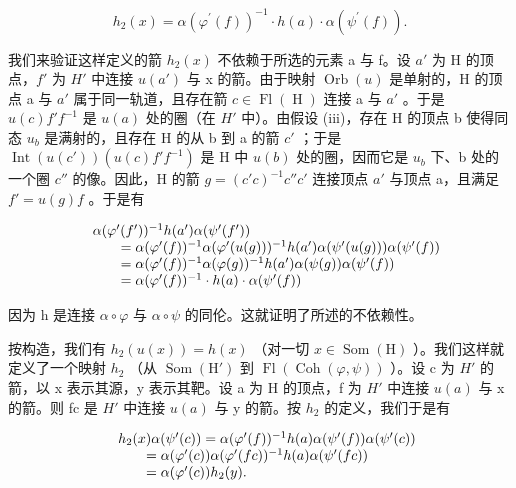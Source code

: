\[
h _ {2} (x) = \alpha (\varphi^ {\prime} (f)) ^ {- 1} \cdot h (a) \cdot \alpha (\psi^ {\prime} (f)).
\]

我们来验证这样定义的箭 \(h_{2}(x)\) 不依赖于所选的元素 a 与 f。设 \(a'\) 为 H 的顶点，\(f'\) 为 \(H'\) 中连接 \(u(a')\) 与 x 的箭。由于映射 \(\operatorname{Orb}(u)\) 是单射的，H 的顶点 a 与 \(a'\) 属于同一轨道，且存在箭 \(c \in \operatorname{Fl}(\operatorname{H})\) 连接 a 与 \(a'\) 。于是 \(u(c)f'f^{-1}\) 是 \(u(a)\) 处的圈（在 \(H'\) 中）。由假设 (iii)，存在 H 的顶点 b 使得同态 \(u_{b}\) 是满射的，且存在 H 的从 b 到 a 的箭 \(c'\) ；于是 \(\operatorname{Int}(u(c'))(u(c)f'f^{-1})\) 是 H 中 \(u(b)\) 处的圈，因而它是 \(u_{b}\) 下、b 处的一个圈 \(c''\) 的像。因此，H 的箭 \(g = (c'c)^{-1}c''c'\) 连接顶点 \(a'\) 与顶点 a，且满足 \(f' = u(g)f\) 。于是有

\[
\begin{array}{r l} & {\alpha (\varphi^ {\prime} (f ^ {\prime})) ^ {- 1} h (a ^ {\prime}) \alpha (\psi^ {\prime} (f ^ {\prime}))} \\ & {\qquad = \alpha (\varphi^ {\prime} (f)) ^ {- 1} \alpha (\varphi^ {\prime} (u (g))) ^ {- 1} h (a ^ {\prime}) \alpha (\psi^ {\prime} (u (g))) \alpha (\psi^ {\prime} (f))} \\ & {\qquad = \alpha (\varphi^ {\prime} (f)) ^ {- 1} \alpha (\varphi (g)) ^ {- 1} h (a ^ {\prime}) \alpha (\psi (g)) \alpha (\psi^ {\prime} (f))} \\ & {\qquad = \alpha (\varphi^ {\prime} (f)) ^ {- 1} \cdot h (a) \cdot \alpha (\psi^ {\prime} (f))} \end{array}
\]

因为 h 是连接 \(\alpha \circ \varphi\) 与 \(\alpha \circ \psi\) 的同伦。这就证明了所述的不依赖性。

按构造，我们有 \(h_{2}(u(x)) = h(x)\) （对一切 \(x \in \operatorname{Som}(\mathrm{H})\) ）。我们这样就定义了一个映射 \(h_{2}\) （从 \(\operatorname{Som}(\mathrm{H}')\) 到 \(\operatorname{Fl}(\operatorname{Coh}(\varphi, \psi))\) ）。设 c 为 \(H'\) 的箭，以 x 表示其源，y 表示其靶。设 a 为 H 的顶点，f 为 \(H'\) 中连接 \(u(a)\) 与 x 的箭。则 fc 是 \(H'\) 中连接 \(u(a)\) 与 y 的箭。按 \(h_{2}\) 的定义，我们于是有

\[
\begin{array}{r l} & h _ {2} (x) \alpha (\psi^ {\prime} (c)) = \alpha (\varphi^ {\prime} (f)) ^ {- 1} h (a) \alpha (\psi^ {\prime} (f)) \alpha (\psi^ {\prime} (c)) \\ & \qquad = \alpha (\varphi^ {\prime} (c)) \alpha (\varphi^ {\prime} (f c)) ^ {- 1} h (a) \alpha (\psi^ {\prime} (f c)) \\ & \qquad = \alpha (\varphi^ {\prime} (c)) h _ {2} (y). \end{array}
\]


